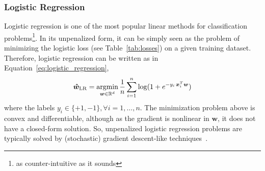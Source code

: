 

			\subsubsection{Logistic Regression} \label{sec:logistic_regression}
			Logistic regression is one of the most popular linear methods for classification problems\footnote{as counter-intuitive as it sounds}. In its unpenalized form, it can be simply seen as the problem of minimizing the logistic loss (see Table~\ref{tab:losses}) on a given training dataset. Therefore, logistic regression can be written as in Equation~\eqref{eq:logistic_regression},
			\begin{equation} \label{eq:logistic_regression}
				\bm{\hat w}_{\text{LR}} = \mathop{\mathrm{argmin}}\limits_{\bm{w} \in \mathbb{R}^d} \frac{1}{n}\sum_{i=1}^n\log(1 + e^{-y_i\,\bm{x}_i^T\bm{w}})
			\end{equation}
			where the labels $y_i \in \{+1,-1\}, \forall i=1,\dots,n$. The minimization problem above is convex and differentiable, although as the gradient is nonlinear in $\bm{w}$, it does not have a closed-form solution. So, unpenalized logistic regression problems are typically solved by (stochastic) gradient descent-like techniques~\cite{boyd2004convex, sra2012optimization}.

